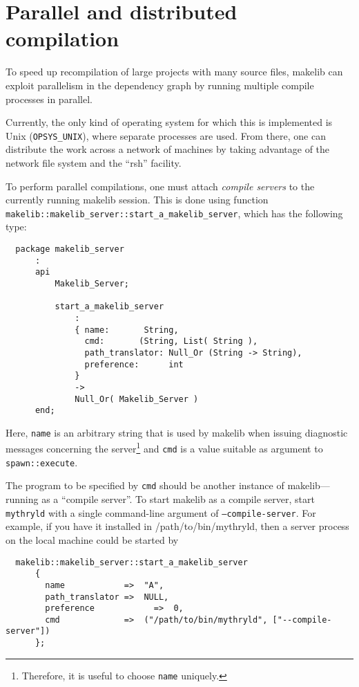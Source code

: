 
\section{Parallel and distributed compilation}
\label{sec:parmake}

To speed up recompilation of large projects with many source files,
makelib can exploit parallelism in the dependency graph by running
multiple compile processes in parallel.

Currently, the only kind of operating system for which this is
implemented is Unix ({\tt OPSYS\_UNIX}), where separate processes are
used.  From there, one can distribute the work across a network of
machines by taking advantage of the network file system and the
``rsh'' facility.

To perform parallel compilations, one must attach {\em compile
servers} to the currently running makelib session.  This is done using
function {\tt makelib::makelib_server::start_a_makelib_server}, which has the
following type:

\begin{verbatim}
  package makelib_server
      :
      api
          Makelib_Server;

          start_a_makelib_server
              :
              { name:       String,
                cmd:       (String, List( String ),
                path_translator: Null_Or (String -> String),
                preference:      int
              }
              ->
              Null_Or( Makelib_Server )
      end;
\end{verbatim}

Here, {\tt name} is an arbitrary string that is used by makelib when
issuing diagnostic messages concerning the server\footnote{Therefore,
it is useful to choose {\tt name} uniquely.} and {\tt cmd} is a value
suitable as argument to {\tt spawn::execute}.

The program to be specified by {\tt cmd} should be another instance of
makelib---running as a ``compile server''.  To start makelib as a compile
server, start {\tt mythryld} with a single command-line argument of
{\tt --compile-server}.
For example, if you have it installed in /path/to/bin/mythryld, then a
server process on the local machine could be started by

\begin{verbatim}
  makelib::makelib_server::start_a_makelib_server
      {
        name            =>  "A",
        path_translator =>  NULL,
        preference            =>  0,
        cmd             =>  ("/path/to/bin/mythryld", ["--compile-server"])
      };
\end{verbatim}


